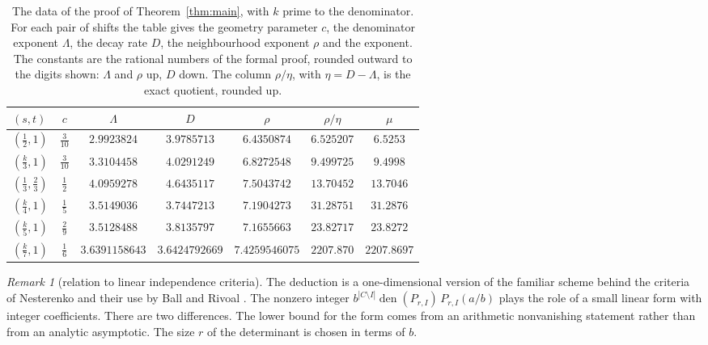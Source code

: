 \documentclass[11pt]{amsart}
\theoremstyle{definition}
\theoremstyle{remark}
\newtheorem{remark}[theorem]{Remark}
\numberwithin{equation}{section}
\newcommand{\den}{\operatorname{den}}
\newcommand{\MuLamU}{31.2876}
\newcommand{\MuThirdsU}{9.4998}
\newcommand{\MuFifthsU}{23.8272}
\newcommand{\MuSeventhsU}{2207.8697}
\newcommand{\MuChi}{13.7046}
\newcommand{\MuHalvesU}{6.5253}
\newcommand{\LamFour}{3.5149036}  \newcommand{\DFour}{3.7447213}  \newcommand{\gFour}{7.1904273}  \newcommand{\ExpFour}{31.28751}
\newcommand{\LamThree}{3.3104458} \newcommand{\DThree}{4.0291249} \newcommand{\gThree}{6.8272548} \newcommand{\ExpThree}{9.499725}
\newcommand{\LamFive}{3.5128488}  \newcommand{\DFive}{3.8135797}  \newcommand{\gFive}{7.1655663}  \newcommand{\ExpFive}{23.82717}
\newcommand{\LamSeven}{3.6391158643} \newcommand{\DSeven}{3.6424792669} \newcommand{\gSeven}{7.4259546075} \newcommand{\ExpSeven}{2207.870}
\newcommand{\LamHalf}{2.9923824}  \newcommand{\DHalf}{3.9785713}  \newcommand{\gHalf}{6.4350874}  \newcommand{\ExpHalf}{6.525207}
\newcommand{\LamChi}{4.0959278}   \newcommand{\DChi}{4.6435117}   \newcommand{\gChi}{7.5043742}  \newcommand{\ExpChi}{13.70452}
\begin{document}
\begin{table}[ht]
\centering
{\setlength{\tabcolsep}{2pt}
\begin{tabular}{@{}lcccccc@{}}
\toprule
$(s,t)$ & $c$ & $\Lambda$ & $D$ & $\rho$ & $\rho/\eta$ & $\mu$\\
\midrule
$(\frac12,1)$ & $\frac3{10}$ & $\LamHalf$ & $\DHalf$ & $\gHalf$ & $\ExpHalf$ & $\MuHalvesU$\\
$(\frac k3,1)$ & $\frac3{10}$ & $\LamThree$ & $\DThree$ & $\gThree$ & $\ExpThree$ & $\MuThirdsU$\\
$(\frac13,\frac23)$ & $\frac12$ & $\LamChi$ & $\DChi$ & $\gChi$ & $\ExpChi$ & $\MuChi$\\
$(\frac k4,1)$ & $\frac15$ & $\LamFour$ & $\DFour$ & $\gFour$ & $\ExpFour$ & $\MuLamU$\\
$(\frac k5,1)$ & $\frac29$ & $\LamFive$ & $\DFive$ & $\gFive$ & $\ExpFive$ & $\MuFifthsU$\\
$(\frac k7,1)$ & $\frac16$ & $\LamSeven$ & $\DSeven$ & $\gSeven$ & $\ExpSeven$ & $\MuSeventhsU$\\
\bottomrule
\end{tabular}}
\caption{The data of the proof of Theorem~\ref{thm:main}, with $k$ prime to the denominator. For each pair of shifts the table gives the geometry parameter
$c$, the denominator exponent $\Lambda$, the decay rate $D$, the neighbourhood exponent $\rho$ and the exponent. The constants
are the rational numbers of the formal proof, rounded outward to the digits shown: $\Lambda$ and $\rho$ up, $D$ down.
The column $\rho/\eta$, with $\eta=D-\Lambda$, is the exact quotient, rounded up.}\label{tab:data}
\end{table}

\begin{remark}[relation to linear independence criteria]
The deduction is a one-dimensional version of the familiar scheme behind the criteria of Nesterenko
\cite{Nesterenko85} and their use by Ball and Rivoal \cite{BallRivoal01}. The nonzero integer
$b^{|C\setminus I|}\den(P_{r,I})\,P_{r,I}(a/b)$ plays the role of a small linear form with integer coefficients. There are
two differences. The lower bound for the form comes from an arithmetic nonvanishing statement rather than from an analytic
asymptotic. The size $r$ of the determinant is chosen in terms of $b$.
\end{remark}
\end{document}

